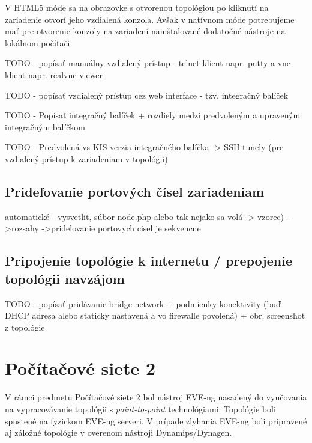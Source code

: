 \begin{enumerate}[noitemsep]
        V HTML5 móde sa na obrazovke s otvorenou topológiou po kliknutí na zariadenie otvorí jeho vzdialená konzola. Avšak v natívnom móde potrebujeme mať pre otvorenie konzoly na zariadení nainštalované dodatočné nástroje na lokálnom počítači
        
{\huge TODO - popísať manuálny vzdialený prístup - telnet klient napr. putty a vnc klient napr. realvnc viewer}
        
{\huge TODO - popísať vzdialený prístup cez web interface - tzv. integračný balíček}
        
{\huge TODO - Popísať integračný balíček + rozdiely medzi predvoleným a upraveným integračným balíčkom}
        
{\huge TODO - Predvolená vs KIS verzia integračného balíčka -> SSH tunely (pre vzdialený prístup k zariadeniam v topológii)}

\end{enumerate}





\subsection{Prideľovanie portových čísel zariadeniam}
    automatické - vysvetliť, súbor node.php alebo tak nejako sa volá -> vzorec)
    ->rozsahy
    ->pridelovanie portovych cisel je sekvencne




\subsection{Pripojenie topológie k internetu / prepojenie topológii navzájom}

{\huge TODO - popísať pridávanie bridge network + podmienky konektivity (buď DHCP adresa alebo staticky nastavená a vo firewalle povolená) + obr. screenshot z topológie}






\section{Počítačové siete 2}

V rámci predmetu Počítačové siete 2 bol nástroj EVE-ng nasadený do vyučovania na vypracovávanie topológii s \emph{point-to-point} technológiami. Topológie boli spustené na fyzickom EVE-ng serveri. V prípade zlyhania EVE-ng boli pripravené aj záložné topológie v overenom nástroji Dynamips/Dynagen.

